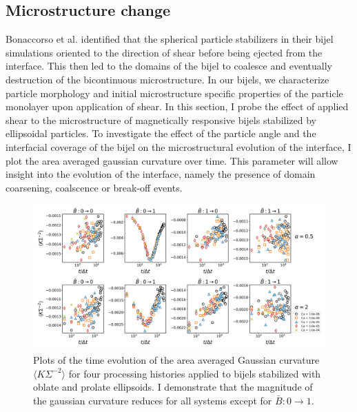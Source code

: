 \subsection{Microstructure change}

Bonaccorso et al. identified that the spherical particle stabilizers in their bijel simulations oriented to the direction of shear before being
ejected from the interface. \cite{bonaccorso_shear_2020} This then led to the domains of the bijel to coalesce and eventually destruction of the
bicontinuous microstructure. \cite{bonaccorso_shear_2020} In our bijels, we characterize particle morphology and initial microstructure specific 
properties of the particle monolayer upon application of shear. 
In this section, I probe the effect of applied shear to the microstructure of magnetically
responsive bijels stabilized by ellipsoidal particles. To investigate the effect of the particle angle and the interfacial coverage of the bijel on the
microstructural evolution of the interface, I plot the area averaged gaussian curvature over time. This parameter will allow insight into the evolution 
of the interface, namely the presence of domain coarsening, coalscence or break-off events.

\begin{figure} 
    \centering 
    \includegraphics[scale=0.3]{../figures/results/paper3/gaussian-time_compare.png} 
    \caption{Plots of the time evolution of the area averaged Gaussian curvature $\langle K \Sigma^{-2} \rangle$ for four 
             processing histories applied to bijels stabilized with oblate and prolate ellipsoids. I demonstrate that the 
             magnitude of the gaussian curvature reduces for all systems except for $\bar{B}: 0 \to 1$.} 
    \label{fig:gaussian_curvature_time_shear} 
\end{figure}

